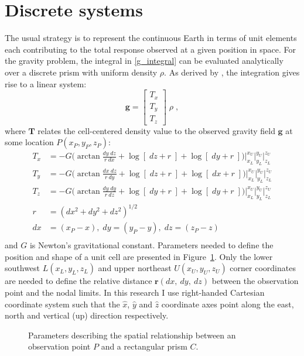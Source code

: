 \section{Discrete systems}
The usual strategy is to represent the continuous Earth in terms of unit elements each contributing to the total response observed at a given position in space.
For the gravity problem, the integral in \eqref{g_integral} can be evaluated analytically over a discrete prism with uniform density $\rho$. As derived by \cite{Nagy66}, the integration gives rise to a linear system:
\begin{equation} \mathbf{g} = \begin{bmatrix} T_{x} \\ T_{y} \\ T_{z} \end{bmatrix} \; \rho \;, \label{gfield} \end{equation}
where $\mathbf{T}$ relates the cell-centered density value to the observed gravity field $\mathbf{g}$ at some location $P(x_P, y_P, z_P)$:
\begin{equation}
\begin{split}
T_{x} &= -G \bigg( \arctan \frac{dy\;dz}{r\:dx} + \log \left[\; dz + r\;\right] + \log \left[\; dy + r\;\right] \bigg) \bigg|_{x_L}^{x_U} \bigg|_{y_L}^{y_U} \bigg|_{z_L}^{z_U}\\
T_{y} &= -G \bigg( \arctan \frac{dx\;dz}{r\:dy} + \log \left[\; dz + r\;\right] + \log \left[\; dx + r\;\right] \bigg) \bigg|_{x_L}^{x_U} \bigg|_{y_L}^{y_U} \bigg|_{z_L}^{z_U}\\
T_{z} &= -G \bigg( \arctan \frac{dy\;dy}{r\:dz} + \log \left[\; dy + r\;\right] + \log \left[\; dy + r\;\right] \bigg) \bigg|_{x_L}^{x_U} \bigg|_{y_L}^{y_U} \bigg|_{z_L}^{z_U}\\
r &= (dx^2 + dy^2 + dz^2)^{1/2} \\
dx &= (x_P - x), \; dy = (y_P - y),\; dz = (z_P - z)\\
\end{split}
\label{Tmatrix}
\end{equation}
and $G$ is Newton's gravitational constant.
Parameters needed to define the position and shape of a unit cell are presented in Figure~\ref{UnitCube}. Only the lower southwest $L(x_L,y_L,z_L)$ and upper northeast $U(x_U,y_U,z_U)$ corner coordinates are needed to define the relative distance $\mathbf{r} (dx,\:dy,\:dz)$ between the observation point and the nodal limits. In this research I use right-handed Cartesian coordinate system such that the $\hat x$, $\hat y$ and $\hat z$ coordinate axes point along the east, north and vertical (up) direction respectively.
\begin{figure}[h!]
\caption{Parameters describing the spatial relationship between an observation point $P$ and a rectangular prism $C$.}
\label{UnitCube}
\end{figure}

